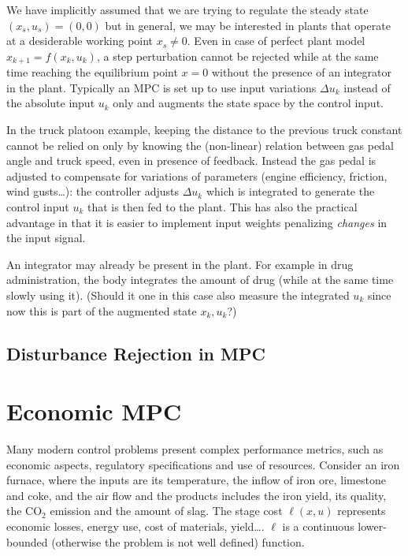 \documentclass[11pt]{report}
\begin{document}
We have implicitly assumed that we are trying to regulate the steady state $(x_s,u_s) = (0,0)$ but in general, we may be interested in plants that operate at a desiderable working point $x_s\neq 0$. Even in case of perfect plant model $x_{k+1} = f(x_k,u_k)$, a step perturbation cannot be rejected while at the same time reaching the equilibrium point $x=0$ without the presence of an integrator in the plant. Typically an MPC is set up to use input variations $\Delta u_k$ instead of the absolute input $u_k$ only and augments the state space by the control input.

In the truck platoon example, keeping the distance to the previous truck constant cannot be relied on only by knowing the (non-linear) relation between gas pedal angle and truck speed, even in presence of feedback. Instead the gas pedal is adjusted to compensate for variations of parameters (engine efficiency, friction, wind gusts\ldots): the controller adjusts $\Delta u_k$ which is integrated to generate the control input $u_k$ that is then fed to the plant. This has also the practical advantage in that it is easier to implement input weights penalizing \emph{changes} in the input signal.

An integrator may already be present in the plant. For example in drug administration, the body integrates the amount of drug (while at the same time slowly using it). (Should it one in this case also measure the integrated $u_k$ since now this is part of the augmented state $x_k,u_k$?)

\subsection{Disturbance Rejection in MPC}
\label{sec:disturbance-rejection}



\section{Economic MPC}
\label{sec:economic-mpc}

Many modern control problems present complex performance metrics, such as economic aspects, regulatory specifications and use of resources. Consider an iron furnace, where the inputs are its temperature, the inflow of iron ore, limestone and coke, and the air flow and the products includes the iron yield, its quality, the CO$_2$ emission and the amount of slag. The stage cost $\ell(x,u)$ represents economic losses, energy use, cost of materials, yield\ldots. $\ell$ is a continuous lower-bounded (otherwise the problem is not well defined) function.
\end{document}
